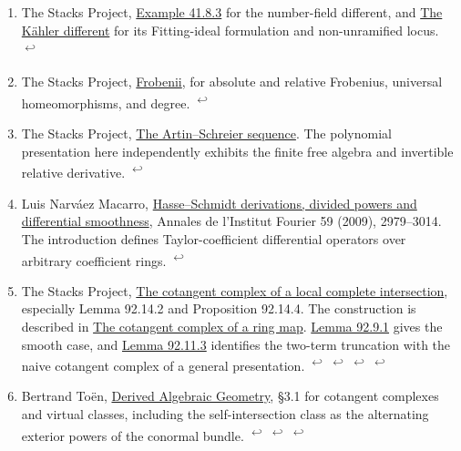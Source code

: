 \documentclass[11pt,letterpaper]{article}
\begin{document}
\begin{enumerate}[leftmargin=1.8em,label=\arabic*.,itemsep=.8em]
\item \hypertarget{note-different}{}The Stacks Project, \href{https://stacks.math.columbia.edu/tag/024Z}{Example 41.8.3} for the number-field different, and \href{https://stacks.math.columbia.edu/tag/0BVV}{The Kähler different} for its Fitting-ideal formulation and non-unramified locus. \hyperlink{citation-different-1}{\textsuperscript{\(\hookleftarrow\)}}
\item \hypertarget{note-frobenius}{}The Stacks Project, \href{https://stacks.math.columbia.edu/tag/0CC6}{Frobenii}, for absolute and relative Frobenius, universal homeomorphisms, and degree. \hyperlink{citation-frobenius-1}{\textsuperscript{\(\hookleftarrow\)}}
\item \hypertarget{note-artin-schreier}{}The Stacks Project, \href{https://stacks.math.columbia.edu/tag/0A3J}{The Artin–Schreier sequence}. The polynomial presentation here independently exhibits the finite free algebra and invertible relative derivative. \hyperlink{citation-artin-schreier-1}{\textsuperscript{\(\hookleftarrow\)}}
\item \hypertarget{note-hasse}{}Luis Narváez Macarro, \href{https://www.numdam.org/item/10.5802/aif.2513.pdf}{Hasse–Schmidt derivations, divided powers and differential smoothness}, Annales de l'Institut Fourier 59 (2009), 2979–3014. The introduction defines Taylor-coefficient differential operators over arbitrary coefficient rings. \hyperlink{citation-hasse-1}{\textsuperscript{\(\hookleftarrow\)}}
\item \hypertarget{note-lci}{}The Stacks Project, \href{https://stacks.math.columbia.edu/tag/08SH}{The cotangent complex of a local complete intersection}, especially Lemma 92.14.2 and Proposition 92.14.4. The construction is described in \href{https://stacks.math.columbia.edu/tag/08PL}{The cotangent complex of a ring map}. \href{https://stacks.math.columbia.edu/tag/08R5}{Lemma 92.9.1} gives the smooth case, and \href{https://stacks.math.columbia.edu/tag/08RB}{Lemma 92.11.3} identifies the two-term truncation with the naive cotangent complex of a general presentation. \hyperlink{citation-lci-1}{\textsuperscript{\(\hookleftarrow\)}} \hyperlink{citation-lci-2}{\textsuperscript{\(\hookleftarrow\)}} \hyperlink{citation-lci-3}{\textsuperscript{\(\hookleftarrow\)}} \hyperlink{citation-lci-4}{\textsuperscript{\(\hookleftarrow\)}}
\item \hypertarget{note-toen}{}Bertrand Toën, \href{https://arxiv.org/pdf/1401.1044}{Derived Algebraic Geometry}, §3.1 for cotangent complexes and virtual classes, including the self-intersection class as the alternating exterior powers of the conormal bundle. \hyperlink{citation-toen-1}{\textsuperscript{\(\hookleftarrow\)}} \hyperlink{citation-toen-2}{\textsuperscript{\(\hookleftarrow\)}} \hyperlink{citation-toen-3}{\textsuperscript{\(\hookleftarrow\)}}

\end{enumerate}
\end{document}
